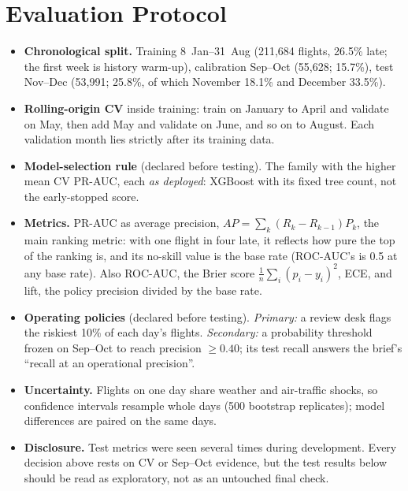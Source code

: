 \documentclass[conference]{IEEEtran}
\newcommand{\tabsize}{\footnotesize}
\begin{document}
\begin{table}[!t]
\caption{Static calibration rule: candidates fitted on September, checked on October. ECE gain: reduction in October ECE relative to raw scores.}
\label{tab:calsel}
\centering\tabsize

\end{table}

\section{Evaluation Protocol}\label{sec:protocol}
\begin{itemize}
\item \textbf{Chronological split.} Training 8~Jan--31~Aug (211{,}684 flights, 26.5\% late; the first week is history warm-up), calibration Sep--Oct (55{,}628; 15.7\%), test Nov--Dec (53{,}991; 25.8\%, of which November 18.1\% and December 33.5\%).
\item \textbf{Rolling-origin CV} inside training: train on January to April and validate on May, then add May and validate on June, and so on to August. Each validation month lies strictly after its training data.
\item \textbf{Model-selection rule} (declared before testing). The family with the higher mean CV PR-AUC, each \emph{as deployed}: XGBoost with its fixed tree count, not the early-stopped score.
\item \textbf{Metrics.} PR-AUC as average precision, $AP=\sum_k(R_k-R_{k-1})P_k$, the main ranking metric: with one flight in four late, it reflects how pure the top of the ranking is, and its no-skill value is the base rate (ROC-AUC's is 0.5 at any base rate). Also ROC-AUC, the Brier score $\frac1n\sum_i(p_i-y_i)^2$, ECE, and lift, the policy precision divided by the base rate.
\item \textbf{Operating policies} (declared before testing). \emph{Primary:} a review desk flags the riskiest 10\% of each day's flights. \emph{Secondary:} a probability threshold frozen on Sep--Oct to reach precision $\ge0.40$; its test recall answers the brief's ``recall at an operational precision''.
\item \textbf{Uncertainty.} Flights on one day share weather and air-traffic shocks, so confidence intervals resample whole days (500 bootstrap replicates); model differences are paired on the same days.
\item \textbf{Disclosure.} Test metrics were seen several times during development. Every decision above rests on CV or Sep--Oct evidence, but the test results below should be read as exploratory, not as an untouched final check.
\end{itemize}
\end{document}

